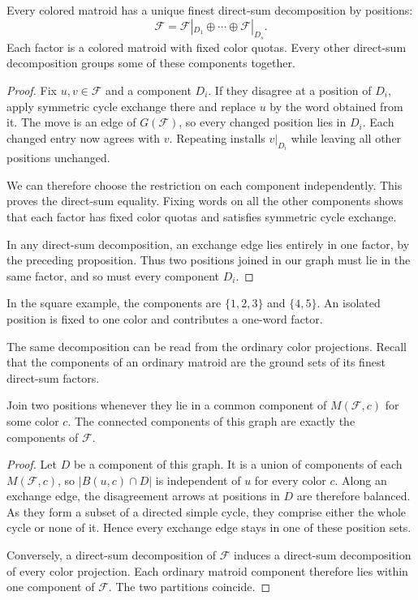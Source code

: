 \begin{theorem}
Every colored matroid has a unique finest direct-sum decomposition by
positions:
\[
 \mathcal F=\mathcal F|_{D_1}\oplus\dotsb\oplus\mathcal F|_{D_s}.
\]
Each factor is a colored matroid with fixed color quotas. Every other
direct-sum decomposition groups some of these components together.
\end{theorem}

\begin{proof}
Fix $u,v\in\mathcal F$ and a component $D_i$. If they disagree at a position
of $D_i$, apply symmetric cycle exchange there and replace $u$ by the word
obtained from it. The move is an edge of $G(\mathcal F)$, so every changed
position lies in $D_i$. Each changed entry now agrees with $v$. Repeating
installs $v|_{D_i}$ while leaving all other positions unchanged.

We can therefore choose the restriction on each component independently.
This proves the direct-sum equality. Fixing words on all the other components
shows that each factor has fixed color quotas and satisfies symmetric cycle
exchange.

In any direct-sum decomposition, an exchange edge lies entirely in one
factor, by the preceding proposition. Thus two positions joined in our graph
must lie in the same factor, and so must every component $D_i$.
\end{proof}

In the square example, the components are $\{1,2,3\}$ and $\{4,5\}$.
An isolated position is fixed to one color and contributes a one-word factor.

The same decomposition can be read from the ordinary color projections.
Recall that the components of an ordinary matroid are the ground sets of its
finest direct-sum factors.

\begin{proposition}
Join two positions whenever they lie in a common component of
$M(\mathcal F,c)$ for some color $c$. The connected components of this graph
are exactly the components of $\mathcal F$.
\end{proposition}

\begin{proof}
Let $D$ be a component of this graph. It is a union of components of each
$M(\mathcal F,c)$, so $|B(u,c)\cap D|$ is independent of $u$ for every color
$c$. Along an exchange edge, the disagreement arrows at positions in $D$
are therefore balanced. As they form a subset of a directed simple cycle,
they comprise either the whole cycle or none of it. Hence every exchange
edge stays in one of these position sets.

Conversely, a direct-sum decomposition of $\mathcal F$ induces a direct-sum
decomposition of every color projection. Each ordinary matroid component
therefore lies within one component of $\mathcal F$. The two partitions
coincide.
\end{proof}

